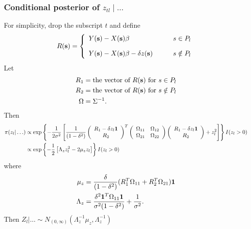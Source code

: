 \subsubsection*{Conditional posterior of $z_{tl} \mid \ldots $}\label{s:mvcondu}
For simplicity, drop the subscript $t$ and define 
\begin{align*}
R(\mbox{\bf s}) = \left\{ 
    \begin{array}{ll}
        Y(\mbox{\bf s}) - X(\mbox{\bf s}) \beta &s \in P_l\\[1em]
        Y(\mbox{\bf s}) - X(\mbox{\bf s}) \beta - \delta z(\mbox{\bf s}) \qquad & s \notin P_l
    \end{array} 
\right.
\end{align*}
Let 
\begin{align*}
    R_1 &= \text{the vector of } R(\mbox{\bf s}) \text{ for } s \in P_l \\
    R_2 &= \text{the vector of } R(\mbox{\bf s}) \text{ for } s \notin P_l \\
    \Omega &= \Sigma^{-1}.
\end{align*}
Then
\begin{align*}
    \pi(z_l | \ldots) &\propto \exp \left\{ -\frac{ 1 }{ 2 \sigma^2 } \left[ \frac{ 1 }{ (1 - \delta^2)}
        \left( \begin{array}{c}
            R_1 - \delta z_l \mbox{\boldmath $1$}\\
            R_2
        \end{array} \right)^T
        \left( \begin{array}{cc}
            \Omega_{11} & \Omega_{12}\\
            \Omega_{21} & \Omega_{22}
        \end{array} \right)
        \left( \begin{array}{c}
            R_1 - \delta z_l \mbox{\boldmath $1$}\\
            R_2
        \end{array} \right)
        +  z_l^2 \right]
    \right\} I(z_l > 0) \\
        &\propto \exp \left\{ -\frac{ 1 }{ 2 } \left[ \Lambda_z z_l^2 - 2 \mu_z z_l \right] \right\} I(z_l > 0)
\end{align*}
where
\begin{align*}
    \mu_z &= \frac{ \delta}{(1 - \delta^2)} ( R_1^T \Omega_{11} + R_2^T \Omega_{21} )\mbox{\boldmath $1$}\\
    \Lambda_z &= \frac{\delta^2 \mbox{\boldmath $1$}^T \Omega_{11} \mbox{\boldmath $1$} }{ \sigma^2 (1 - \delta^2) } + \frac{ 1 }{ \sigma^2 }.
\end{align*}
Then $Z_l | \ldots \sim N_{(0, \infty)} (\Lambda_z^{-1} \mu_z, \Lambda_z^{-1})$